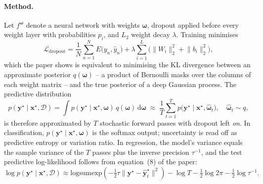 \documentclass{article}
\begin{document}
\paragraph{Method.} Let $f^{\boldsymbol\omega}$ denote a neural network with weights $\boldsymbol\omega$, dropout applied before every weight layer with probabilities $p_i$, and $L_2$ weight decay $\lambda$. Training minimises
\begin{equation}
\mathcal{L}_{\text{dropout}}=\frac{1}{N}\sum_{n=1}^{N}E\bigl(y_n,\hat y_n\bigr)+\lambda\sum_{i=1}^{L}\bigl(\lVert W_i\rVert_2^2+\lVert b_i\rVert_2^2\bigr),
\end{equation}
which the paper shows is equivalent to minimising the KL divergence between an approximate posterior $q(\boldsymbol\omega)$ -- a product of Bernoulli masks over the columns of each weight matrix -- and the true posterior of a deep Gaussian process. The predictive distribution
\begin{equation}
p(\mathbf{y}^\star\mid\mathbf{x}^\star,\mathcal{D})=\int p(\mathbf{y}^\star\mid\mathbf{x}^\star,\boldsymbol\omega)\,q(\boldsymbol\omega)\,\mathrm{d}\boldsymbol\omega \;\approx\; \frac{1}{T}\sum_{t=1}^{T}p\bigl(\mathbf{y}^\star\mid\mathbf{x}^\star,\hat{\boldsymbol\omega}_t\bigr),\quad\hat{\boldsymbol\omega}_t\sim q,
\label{eq:mcdo}
\end{equation}
is therefore approximated by $T$ stochastic forward passes with dropout left \emph{on}. In classification, $p(\mathbf{y}^\star\mid\mathbf{x}^\star,\boldsymbol\omega)$ is the softmax output; uncertainty is read off as predictive entropy or variation ratio. In regression, the model's variance equals the sample variance of the $T$ passes plus the inverse precision $\tau^{-1}$, and the test predictive log-likelihood follows from equation~(8) of the paper:
\begin{equation}
\log p(\mathbf{y}^\star\mid\mathbf{x}^\star,\mathcal{D})\approx \mathrm{logsumexp}\!\left(-\tfrac{1}{2}\tau\lVert \mathbf{y}^\star-\hat{\mathbf{y}}^\star_t\rVert^2\right)-\log T -\tfrac{1}{2}\log 2\pi -\tfrac{1}{2}\log\tau^{-1}.
\label{eq:ll}
\end{equation}
\end{document}
